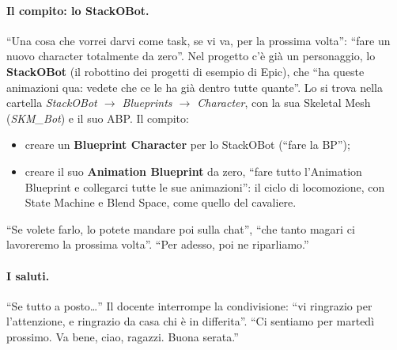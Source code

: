 \paragraph{Il compito: lo StackOBot.} ``Una cosa che vorrei darvi come task, se vi va, per
la prossima volta'': ``fare un nuovo character totalmente da zero''. Nel progetto c'è già
un personaggio, lo \textbf{StackOBot} (il robottino dei progetti di esempio di Epic), che
``ha queste animazioni qua: vedete che ce le ha già dentro tutte quante''. Lo si trova
nella cartella \emph{StackOBot $\rightarrow$ Blueprints $\rightarrow$ Character}, con la
sua Skeletal Mesh (\emph{SKM\_Bot}) e il suo ABP. Il compito:
\begin{itemize}
  \item creare un \textbf{Blueprint Character} per lo StackOBot (``fare la BP'');
  \item creare il suo \textbf{Animation Blueprint} da zero, ``fare tutto l'Animation
        Blueprint e collegarci tutte le sue animazioni'': il ciclo di locomozione, con
        State Machine e Blend Space, come quello del cavaliere.
\end{itemize}
``Se volete farlo, lo potete mandare poi sulla chat'', ``che tanto magari ci lavoreremo
la prossima volta''. ``Per adesso, poi ne riparliamo.''

\paragraph{I saluti.} ``Se tutto a posto\dots'' Il docente interrompe la condivisione:
``vi ringrazio per l'attenzione, e ringrazio da casa chi è in differita''. ``Ci sentiamo
per martedì prossimo. Va bene, ciao, ragazzi. Buona serata.''

